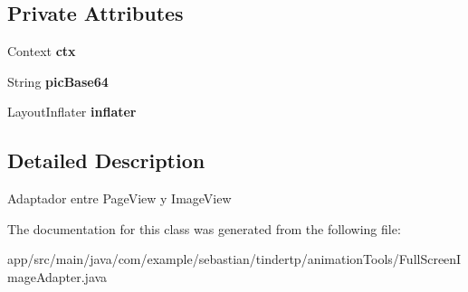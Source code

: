 \subsection*{Private Attributes}
\begin{DoxyCompactItemize}
\item 
Context {\bfseries ctx}\hypertarget{classcom_1_1example_1_1sebastian_1_1tindertp_1_1animationTools_1_1FullScreenImageAdapter_afc69669d3efc9922b8cf6a4779de388f}{}\label{classcom_1_1example_1_1sebastian_1_1tindertp_1_1animationTools_1_1FullScreenImageAdapter_afc69669d3efc9922b8cf6a4779de388f}

\item 
String {\bfseries pic\+Base64}\hypertarget{classcom_1_1example_1_1sebastian_1_1tindertp_1_1animationTools_1_1FullScreenImageAdapter_a1f2883c921cdf9f91a2bd551d3268ef5}{}\label{classcom_1_1example_1_1sebastian_1_1tindertp_1_1animationTools_1_1FullScreenImageAdapter_a1f2883c921cdf9f91a2bd551d3268ef5}

\item 
Layout\+Inflater {\bfseries inflater}\hypertarget{classcom_1_1example_1_1sebastian_1_1tindertp_1_1animationTools_1_1FullScreenImageAdapter_a11b97b26745cd2837216c82d7e7d9b0e}{}\label{classcom_1_1example_1_1sebastian_1_1tindertp_1_1animationTools_1_1FullScreenImageAdapter_a11b97b26745cd2837216c82d7e7d9b0e}

\end{DoxyCompactItemize}


\subsection{Detailed Description}
Adaptador entre Page\+View y Image\+View 

The documentation for this class was generated from the following file\+:\begin{DoxyCompactItemize}
\item 
app/src/main/java/com/example/sebastian/tindertp/animation\+Tools/Full\+Screen\+Image\+Adapter.\+java\end{DoxyCompactItemize}
